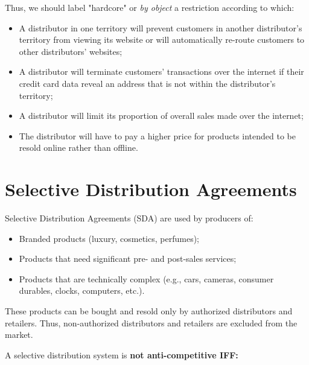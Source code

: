        \medskip

\noindent
        Thus, we should label "hardcore" or \emph{by object} a restriction according to which:
        
        \begin{itemize}
            \item A distributor in one territory will prevent customers in another distributor’s territory from viewing its website or will automatically re-route customers to other distributors’ websites;
            \item A distributor will terminate customers’ transactions over the internet if their credit card data reveal an address that is not within the distributor’s territory;
            \item A distributor will limit its proportion of overall sales made over the internet;
            \item The distributor will have to pay a higher price for products intended to be resold online rather than offline.
        \end{itemize}


\section{Selective Distribution Agreements}

    Selective Distribution Agreements (SDA) are used by producers of:
    
    \begin{itemize}
        \item Branded products (luxury, cosmetics, perfumes);
        \item Products that need significant pre- and post-sales services;
        \item Products that are technically complex (e.g., cars, cameras, consumer durables, clocks, computers, etc.).
    \end{itemize}
    
    These products can be bought and resold only by authorized distributors and retailers. Thus, non-authorized distributors and retailers are excluded from the market.
    
    
    A selective distribution system is \textbf{not anti-competitive IFF:}
    

